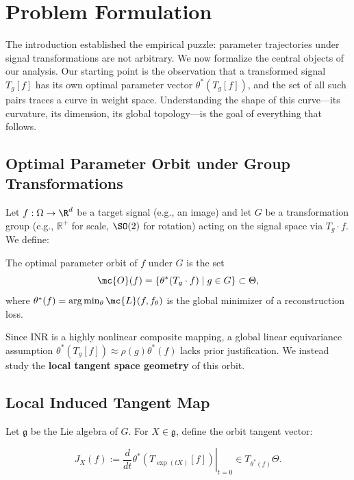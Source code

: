 \section{Problem Formulation}
\label{sec:formulation}

The introduction established the empirical puzzle: parameter trajectories under signal transformations are not arbitrary.
We now formalize the central objects of our analysis.
Our starting point is the observation that a transformed signal $T_g[f]$ has its own optimal parameter vector $\theta^*(T_g[f])$, and the set of all such pairs traces a curve in weight space.
Understanding the shape of this curve---its curvature, its dimension, its global topology---is the goal of everything that follows.

\subsection{Optimal Parameter Orbit under Group Transformations}

Let $f: \Omega \to \R^d$ be a target signal (e.g., an image) and let $G$ be a transformation group (e.g., $\mathbb{R}^+$ for scale, $\SO(2)$ for rotation) acting on the signal space via $T_g \cdot f$.
We define:

\begin{definition}
The optimal parameter orbit of $f$ under $G$ is the set
\begin{equation}
    \mc{O}(f) = \{\theta^*(T_g \cdot f) \mid g \in G\} \subset \Theta,
\end{equation}
where $\theta^*(f) = \arg\min_{\theta} \mc{L}(f, f_\theta)$ is the global minimizer of a reconstruction loss.
\end{definition}

Since INR is a highly nonlinear composite mapping, a global linear equivariance assumption $\theta^*(T_g[f]) \approx \rho(g)\theta^*(f)$ lacks prior justification.
We instead study the \textbf{local tangent space geometry} of this orbit.

\subsection{Local Induced Tangent Map}

Let $\mathfrak{g}$ be the Lie algebra of $G$.
For $X \in \mathfrak{g}$, define the orbit tangent vector:

\begin{definition}
\begin{equation}
    J_X(f) := \left.\frac{d}{dt} \theta^*(T_{\exp(tX)}[f])\right|_{t=0} \in T_{\theta^*(f)}\Theta.
    \label{eq:tangent_map}
\end{equation}
\end{definition}

